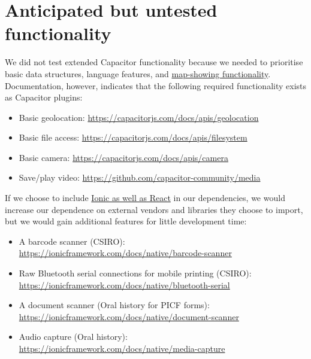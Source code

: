 \documentclass{faims3_report}
\begin{document}
\section{Anticipated but untested functionality
}

We did not test extended Capacitor functionality because we needed to
prioritise basic data structures, language features, and
\href{https://capacitorjs.com/docs/plugins/community}{{map-showing
functionality}}. Documentation, however, indicates that the following
required functionality exists as Capacitor plugins:

\begin{itemize}
\item Basic geolocation:
  \href{https://capacitorjs.com/docs/apis/geolocation}{{https://capacitorjs.com/docs/apis/geolocation}}
 
\item Basic file access:
  \href{https://capacitorjs.com/docs/apis/filesystem}{{https://capacitorjs.com/docs/apis/filesystem}}
 
\item Basic camera:
  \href{https://capacitorjs.com/docs/apis/camera}{{https://capacitorjs.com/docs/apis/camera}}
 
\item Save/play video:
  \href{https://github.com/capacitor-community/media}{{https://github.com/capacitor-community/media}}
 
\end{itemize}

If we choose to include
\href{https://www.smashingmagazine.com/2019/08/building-mobile-apps-ionic-react/}{{Ionic
as well as React}} in our dependencies, we would increase our dependence
on external vendors and libraries they choose to import, but we would
gain additional features for little development time:

\begin{itemize}
\item A barcode scanner (CSIRO):
  \href{https://ionicframework.com/docs/native/barcode-scanner}{{https://ionicframework.com/docs/native/barcode-scanner}}
 
\item Raw Bluetooth serial connections for mobile printing (CSIRO):
  \href{https://ionicframework.com/docs/native/bluetooth-serial}{{https://ionicframework.com/docs/native/bluetooth-serial}}
 
\item A document scanner (Oral history for PICF forms):
  \href{https://ionicframework.com/docs/native/document-scanner}{{https://ionicframework.com/docs/native/document-scanner}}
 
\item Audio capture (Oral history):
  \href{https://ionicframework.com/docs/native/media-capture}{{https://ionicframework.com/docs/native/media-capture}}
 
\end{itemize}
\end{document}
